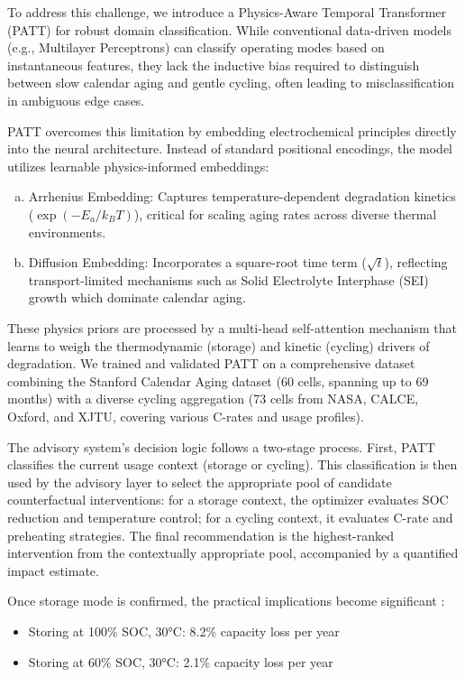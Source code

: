 \documentclass[5p,times,authoryear]{elsarticle}
\begin{document}
To address this challenge, we introduce a Physics-Aware Temporal Transformer (PATT) for robust domain classification. While conventional data-driven models (e.g., Multilayer Perceptrons) can classify operating modes based on instantaneous features, they lack the inductive bias required to distinguish between slow calendar aging and gentle cycling, often leading to misclassification in ambiguous edge cases.

PATT overcomes this limitation by embedding electrochemical principles directly into the neural architecture. Instead of standard positional encodings, the model utilizes learnable physics-informed embeddings:
\begin{enumerate}[(a)]
    \item Arrhenius Embedding: Captures temperature-dependent degradation kinetics ($\exp(-E_a/k_B T)$), critical for scaling aging rates across diverse thermal environments.
    \item Diffusion Embedding: Incorporates a square-root time term ($\sqrt{t}$), reflecting transport-limited mechanisms such as Solid Electrolyte Interphase (SEI) growth which dominate calendar aging.
\end{enumerate}

These physics priors are processed by a multi-head self-attention mechanism that learns to weigh the thermodynamic (storage) and kinetic (cycling) drivers of degradation. We trained and validated PATT on a comprehensive dataset combining the Stanford Calendar Aging dataset (60 cells, spanning up to 69 months) with a diverse cycling aggregation (73 cells from NASA, CALCE, Oxford, and XJTU, covering various C-rates and usage profiles).

The advisory system's decision logic follows a two-stage process. First, PATT classifies the current usage context (storage or cycling). This classification is then used by the advisory layer to select the appropriate pool of candidate counterfactual interventions: for a storage context, the optimizer evaluates SOC reduction and temperature control; for a cycling context, it evaluates C-rate and preheating strategies. The final recommendation is the highest-ranked intervention from the contextually appropriate pool, accompanied by a quantified impact estimate.




Once storage mode is confirmed, the practical implications become significant \citep{schimpe2018comprehensive, ecker2014calendar}:
\begin{itemize}
    \item Storing at 100\% SOC, 30°C: 8.2\% capacity loss per year
    \item Storing at 60\% SOC, 30°C: 2.1\% capacity loss per year
\end{itemize}
\end{document}
